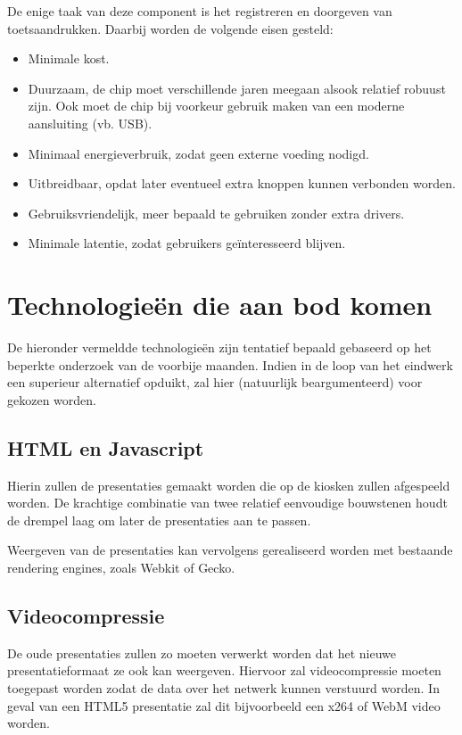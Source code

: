 \documentclass[a4paper,oneside,11pt,final]{memoir}
\begin{document}
De enige taak van deze component is het registreren en doorgeven van toetsaandrukken. Daarbij worden de volgende eisen gesteld:
\begin{itemize}
	\item Minimale kost.
	\item Duurzaam, de chip moet verschillende jaren meegaan alsook relatief robuust zijn. Ook moet de chip bij voorkeur gebruik maken van een moderne aansluiting (vb. USB).
	\item Minimaal energieverbruik, zodat geen externe voeding nodigd.
	\item Uitbreidbaar, opdat later eventueel extra knoppen kunnen verbonden worden.
	\item Gebruiksvriendelijk, meer bepaald te gebruiken zonder extra drivers.
	\item Minimale latentie, zodat gebruikers geïnteresseerd blijven.
\end{itemize}


\section{Technologieën die aan bod komen}

De hieronder vermeldde technologieën zijn tentatief bepaald gebaseerd op het beperkte onderzoek van de voorbije maanden. Indien in de loop van het eindwerk een superieur alternatief opduikt, zal hier (natuurlijk beargumenteerd) voor gekozen worden.

\subsection{HTML en Javascript}

Hierin zullen de presentaties gemaakt worden die op de kiosken zullen afgespeeld worden. De krachtige combinatie van twee relatief eenvoudige bouwstenen houdt de drempel laag om later de presentaties aan te passen.

Weergeven van de presentaties kan vervolgens gerealiseerd worden met bestaande rendering engines, zoals Webkit of Gecko.

\subsection{Videocompressie}

De oude presentaties zullen zo moeten verwerkt worden dat het nieuwe presentatieformaat ze ook kan weergeven. Hiervoor zal videocompressie moeten toegepast worden zodat de data over het netwerk kunnen verstuurd worden. In geval van een HTML5 presentatie zal dit bijvoorbeeld een x264 of WebM video worden.
\end{document}

